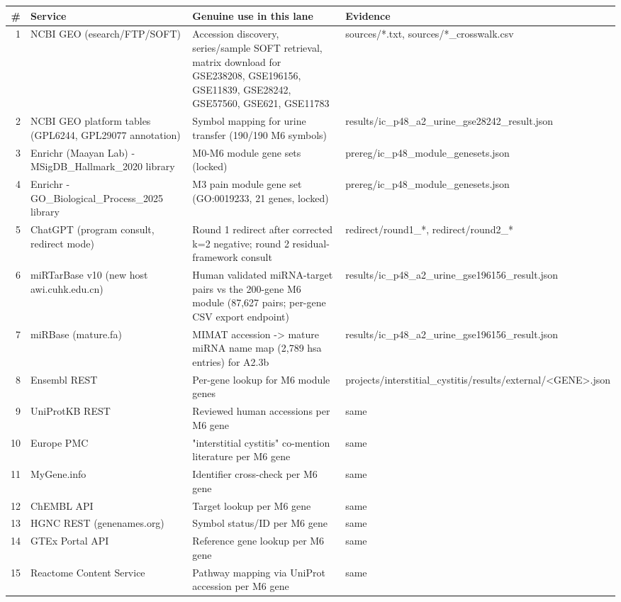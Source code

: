 \begin{longtable}{r p{} p{} p{}}
\hline\hline \# & Service & Genuine use in this lane & Evidence \\
\hline\endhead
1 & NCBI GEO (esearch/FTP/SOFT) & Accession discovery, series/sample SOFT retrieval, matrix download for GSE238208, GSE196156, GSE11839, GSE28242, GSE57560, GSE621, GSE11783 & sources/*.txt, sources/*\_crosswalk.csv \\
2 & NCBI GEO platform tables (GPL6244, GPL29077 annotation) & Symbol mapping for urine transfer (190/190 M6 symbols) & results/ic\_p48\_a2\_urine\_gse28242\_result.json \\
3 & Enrichr (Maayan Lab) - MSigDB\_Hallmark\_2020 library & M0-M6 module gene sets (locked) & prereg/ic\_p48\_module\_genesets.json \\
4 & Enrichr - GO\_Biological\_Process\_2025 library & M3 pain module gene set (GO:0019233, 21 genes, locked) & prereg/ic\_p48\_module\_genesets.json \\
5 & ChatGPT (program consult, redirect mode) & Round 1 redirect after corrected k=2 negative; round 2 residual-framework consult & redirect/round1\_*, redirect/round2\_* \\
6 & miRTarBase v10 (new host awi.cuhk.edu.cn) & Human validated miRNA-target pairs vs the 200-gene M6 module (87,627 pairs; per-gene CSV export endpoint) & results/ic\_p48\_a2\_urine\_gse196156\_result.json \\
7 & miRBase (mature.fa) & MIMAT accession -> mature miRNA name map (2,789 hsa entries) for A2.3b & results/ic\_p48\_a2\_urine\_gse196156\_result.json \\
8 & Ensembl REST & Per-gene lookup for M6 module genes & projects/interstitial\_cystitis/results/external/<GENE>.json \\
9 & UniProtKB REST & Reviewed human accessions per M6 gene & same \\
10 & Europe PMC & "interstitial cystitis" co-mention literature per M6 gene & same \\
11 & MyGene.info & Identifier cross-check per M6 gene & same \\
12 & ChEMBL API & Target lookup per M6 gene & same \\
13 & HGNC REST (genenames.org) & Symbol status/ID per M6 gene & same \\
14 & GTEx Portal API & Reference gene lookup per M6 gene & same \\
15 & Reactome Content Service & Pathway mapping via UniProt accession per M6 gene & same \\

\end{longtable}
